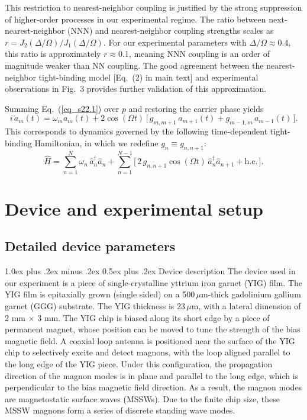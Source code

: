 \documentclass[
twocolumn,

superscriptaddress,









 amsmath,amssymb,
 aps,


prl,




]{revtex4-2}
\makeatletter
\providecommand{\subsubsection}{}
\renewcommand{\subsubsection}{
  \@startsection{subsubsection}{3}{0pt}
    {1.0ex plus .2ex minus .2ex}
    {0.5ex plus .2ex}
    {\normalfont\normalsize\bfseries\filcenter}
}
\makeatother
\begin{document}
This restriction to nearest-neighbor coupling is justified by the strong suppression of higher-order processes in our experimental regime. The ratio between next-nearest-neighbor (NNN) and nearest-neighbor coupling strengths scales as $r = J_2(\Delta/\Omega)/J_1(\Delta/\Omega)$. For our experimental parameters with $\Delta/\Omega \approx 0.4$, this ratio is approximately $r \approx 0.1$, meaning NNN coupling is an order of magnitude weaker than NN coupling. The good agreement between the nearest-neighbor tight-binding model [Eq.~(2) in main text] and experimental observations in Fig.~3 provides further validation of this approximation.

Summing Eq.~(\ref{eq_s22.1}) over \(p\)  and restoring the carrier phase yields
\begin{equation}
i\,\dot a_m(t)=\omega_m a_m(t)
+ 2\cos(\Omega t)\,\Big[\, g_{m,m+1}\,a_{m+1}(t)+g_{m-1,m}\,a_{m-1}(t)\,\Big].
\end{equation}
This corresponds to dynamics governed by the following time-dependent tight-binding Hamiltonian, in which we redefine $g_n \equiv g_{n,n+1}$:
\begin{equation}
\hat H=\sum_{n=1}^{N}\omega_n\,\hat a_n^\dagger\hat a_n
+\sum_{n=1}^{N-1}\Big[\,2\,g_{n,n+1}\cos(\Omega t)\,\hat a_n^\dagger\hat a_{n+1}+\text{h.c.}\,\Big].
\end{equation}



\section{Device and experimental setup}

\subsection{Detailed device parameters}

\subsubsection{Device description}
The device used in our experiment is a piece of single-crystalline yttrium iron garnet (YIG) film. The YIG film is epitaxially grown (single sided) on a 500\,$\mu$m-thick gadolinium gallium garnet (GGG) substrate. The YIG thickness is 23\,$\mu$m, with a lateral dimension of 2 mm $\times$ 3 mm. The YIG chip is biased along its short edge by a piece of permanent magnet, whose position can be moved to tune the strength of the bias magnetic field. A coaxial loop antenna is positioned near the surface of the YIG chip to selectively excite and detect magnons, with the loop aligned parallel to the long edge of the YIG piece. Under this configuration, the propagation direction of the magnon modes is in plane and parallel to the long edge, which is perpendicular to the bias magnetic field direction. As a result, the magnon modes are magnetostatic surface waves (MSSWs). Due to the finite chip size, these MSSW magnons form a series of discrete standing wave modes.
\end{document}
